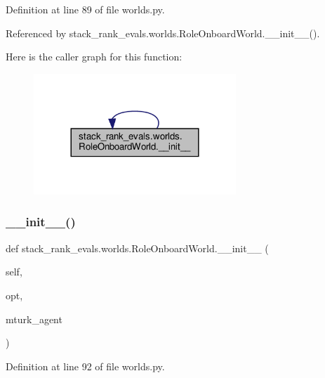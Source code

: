 Definition at line 89 of file worlds.\+py.



Referenced by stack\+\_\+rank\+\_\+evals.\+worlds.\+Role\+Onboard\+World.\+\_\+\+\_\+init\+\_\+\+\_\+().

Here is the caller graph for this function\+:
\nopagebreak
\begin{figure}[H]
\begin{center}
\leavevmode
\includegraphics[width=216pt]{classstack__rank__evals_1_1worlds_1_1RoleOnboardWorld_a93c85daae3056c33bc77b6159ce43b57_icgraph}
\end{center}
\end{figure}
\mbox{\label{classstack__rank__evals_1_1worlds_1_1RoleOnboardWorld_a93c85daae3056c33bc77b6159ce43b57}} 
\subsubsection{\texorpdfstring{\+\_\+\+\_\+init\+\_\+\+\_\+()}{\_\_init\_\_()}\hspace{0.1cm}{\footnotesize\ttfamily [2/2]}}
{\footnotesize\ttfamily def stack\+\_\+rank\+\_\+evals.\+worlds.\+Role\+Onboard\+World.\+\_\+\+\_\+init\+\_\+\+\_\+ (\begin{DoxyParamCaption}\item[{}]{self,  }\item[{}]{opt,  }\item[{}]{mturk\+\_\+agent }\end{DoxyParamCaption})}



Definition at line 92 of file worlds.\+py.



